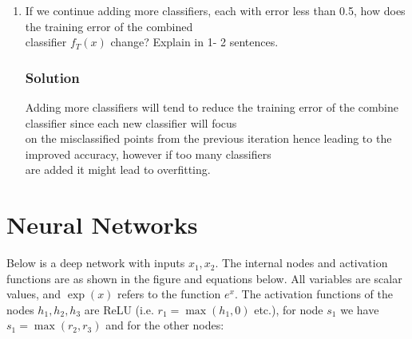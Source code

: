 \documentclass{article}
\begin{document}
\begin{enumerate}[label=\alph*)]
   \item If we continue adding more classifiers, each with error less than 0.5, how does the training error of the combined\\
   classifier \(f_T(x)\) change? Explain in 1- 2 sentences.
   \subsubsection*{Solution}
   Adding more classifiers will tend to reduce the training error of the combine classifier since each new classifier will focus\\
   on the misclassified points from the previous iteration hence leading to the improved accuracy, however if too many classifiers\\
   are added it might lead to overfitting.

 \end{enumerate}

\clearpage

 \section{Neural Networks}
 Below is a deep network with inputs \(x_1, x_2\). The internal nodes and activation functions are as shown in the figure and equations below.
 All variables are scalar values, and \(\exp(x)\) refers to the function \(e^x\). The activation functions of the nodes \(h_1, h_2, h_3\) are 
 ReLU (i.e. \(r_1 = \max(h_1, 0)\) etc.), for node \(s_1\) we have \(s_1 = \max(r_2, r_3)\) and for the other nodes:
\end{document}
